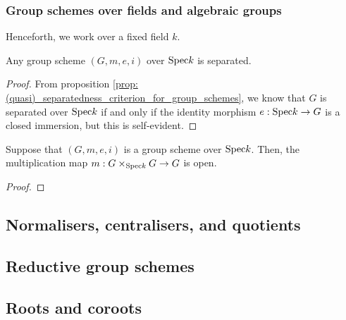         \subsubsection{Group schemes over fields and algebraic groups}
            \begin{convention}
                Henceforth, we work over a fixed field $k$.
            \end{convention}
            
            \begin{proposition} \label{prop: group_schemes_over_fields_are_separated}
                Any group scheme $(G, m, e, i)$ over $\mathrm{Spec} k$ is separated. 
            \end{proposition}
                \begin{proof}
                    From proposition \ref{prop: (quasi)_separatedness_criterion_for_group_schemes}, we know that $G$ is separated over $\mathrm{Spec} k$ if and only if the identity morphism $e: \mathrm{Spec} k \to G$ is a closed immersion, but this is self-evident.
                \end{proof}
            
            \begin{proposition} \label{prop: multiplication_maps_of_group_schemes_over_fields_are_open}
                Suppose that $(G, m, e, i)$ is a group scheme over $\mathrm{Spec} k$. Then, the multiplication map $m: G \x_{\Spec k} G \to G$ is open.
            \end{proposition}
                \begin{proof}
                    
                \end{proof}
                
    \subsection{Normalisers, centralisers, and quotients}
    
    \subsection{Reductive group schemes}
    
    \subsection{Roots and coroots}